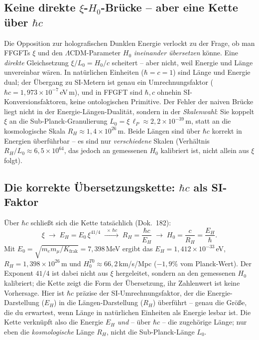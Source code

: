 \subsection*{Keine direkte \texorpdfstring{$\xi$}{xi}-\texorpdfstring{$H_0$}{H0}-Brücke -- aber eine Kette über \texorpdfstring{$\hbar c$}{hbar c}}

Die Opposition zur holografischen Dunklen Energie verlockt zu der Frage, ob
man FFGFTs $\xi$ und den $\Lambda$CDM-Parameter $H_0$ \emph{ineinander
übersetzen} könne. Eine \emph{direkte} Gleichsetzung $\xi/L_0 = H_0/c$
scheitert -- aber nicht, weil Energie und Länge unvereinbar wären. In
natürlichen Einheiten ($\hbar = c = 1$) sind Länge und Energie dual; der
Übergang zu SI-Metern ist genau ein Umrechnungsfaktor ($\hbar c =
1{,}973\times10^{-7}$\,eV\,m), und in FFGFT sind $\hbar, c$ ohnehin
SI-Konversionsfaktoren, keine ontologischen Primitive. Der Fehler der naiven
Brücke liegt nicht in der Energie-Längen-Dualität, sondern in der
\emph{Skalenwahl}: Sie koppelt $\xi$ an die Sub-Planck-Granulierung
$L_0 = \xi\,\ell_P \approx 2{,}2\times10^{-39}$\,m, statt an die kosmologische
Skala $R_H \approx 1{,}4\times10^{26}$\,m. Beide Längen sind über $\hbar c$
korrekt in Energien überführbar -- es sind nur \emph{verschiedene} Skalen
(Verhältnis $R_H/L_0 \approx 6{,}5\times10^{64}$, das jedoch an gemessenen $H_0$ kalibriert ist, nicht allein aus $\xi$
folgt).

\subsection*{Die korrekte Übersetzungskette: $\hbar c$ als SI-Faktor}

Über $\hbar c$ schließt sich die Kette tatsächlich (Dok.~182):
\[
  \xi \;\longrightarrow\; E_H = E_0\,\xi^{41/4}
  \;\xrightarrow{\;\times\,\hbar c\;}\; R_H = \frac{\hbar c}{E_H}
  \;\longrightarrow\; H_0 = \frac{c}{R_H} = \frac{E_H}{\hbar}.
\]
Mit $E_0 = \sqrt{m_e m_\mu/K_{\text{frak}}} = 7{,}398$\,MeV ergibt das $E_H = 1{,}412\times
10^{-33}$\,eV, $R_H = 1{,}398\times10^{26}$\,m und $H_0^{T0} \approx
66{,}2$\,km/s/Mpc ($-1{,}9\%$ vom Planck-Wert). Der Exponent $41/4$ ist dabei
nicht aus $\xi$ hergeleitet, sondern an den gemessenen $H_0$ kalibriert; die
Kette zeigt die Form der Übersetzung, ihr Zahlenwert ist keine Vorhersage. Hier ist $\hbar c$ präzise der
SI-Umrechnungsfaktor, der die Energie-Darstellung ($E_H$) in die
Längen-Darstellung ($R_H$) überführt -- genau die Größe, die du erwartest,
wenn Länge in natürlichen Einheiten als Energie lesbar ist. Die Kette verknüpft also
die Energie $E_H$ \emph{und} -- über $\hbar c$ -- die zugehörige Länge; nur
eben die \emph{kosmologische} Länge $R_H$, nicht die Sub-Planck-Länge $L_0$.

